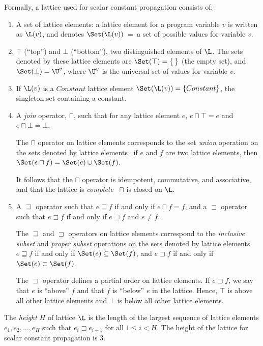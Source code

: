 Formally, a lattice used for scalar constant
propagation consists of:
\begin{enumerate}
\item A set of lattice elements:
a lattice element for a program variable $v$ is written
as $\L(v)$, and denotes $\Set(\L(v))$~=~a set of possible values for
variable $v$.

\item $\top$ (``top'') and $\bot$ (``bottom''), two distinguished
elements of $\L$.
The sets denoted by these lattice elements are
$\Set(\top) = \{\;\}$ (the empty set), and $\Set(\bot) = \U^v$,
where $\U^v$ is the universal set of values for variable
$v$.
\item  If $\L(v)$ is a $Constant$ lattice element
$\Set(\L(v)) = \{Constant\}$, the singleton set containing a constant.
\item A {\it join}
operator, $\sqcap$, such that for any lattice element $e$,
$e \sqcap \top = e$ and $e \sqcap \bot = \bot$. 

The $\sqcap$ operator on lattice elements corresponds to the set {\it union}
operation on the sets denoted by lattice elements
\ie\ if $e$ and $f$ are two lattice elements, then 
$\Set(e \sqcap f) = \Set(e) \cup \Set(f)$.

It follows that the $\sqcap$
operator is idempotent, commutative, and associative, and 
that the lattice is {\it complete} \ie\ $\sqcap$ is closed
on $\L$.
\item A $\sqsupseteq$ operator such that $e \sqsupseteq f$ if and only if
$e \sqcap f = f$, and a $\sqsupset$ operator such that $e \sqsupset f$
if and only if $e \sqsupseteq f$ and $e \not= f$.

The $\sqsupseteq$ and $\sqsupset$ operators on lattice elements
correspond to the {\it inclusive subset} and {\it proper subset}
operations on the sets denoted by lattice elements \ie\
$e \sqsupseteq f$ if and only if $\Set(e) \subseteq \Set(f)$, and
$e \sqsupset f$ if and only if $\Set(e) \subset \Set(f)$.

The $\sqsupset$ operator defines a partial order on lattice elements.
If $e \sqsupset f$, we say that $e$ is ``above'' $f$ and that $f$ is ``below''
$e$ in the lattice.  Hence, $\top$ is above all other lattice elements
and $\bot$ is below all other lattice elements.
\end{enumerate}
The {\it height} $H$ of lattice $\L$ is the length of the largest 
sequence of lattice elements $e_1, e_2, \ldots, e_H$ such that
$e_i \sqsupset e_{i+1}$ for all $1 \leq i < H$. The height of the
lattice for scalar constant propagation is 3.


